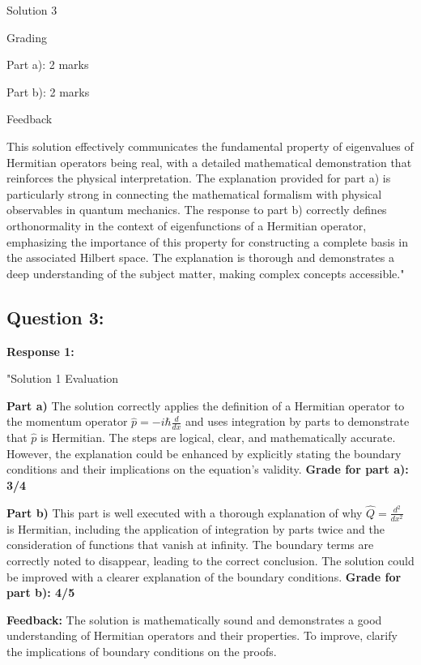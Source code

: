 \documentclass[a4paper,11pt]{article}
\begin{document}
Solution 3

Grading

Part a): 2 marks

Part b): 2 marks

Feedback

This solution effectively communicates the fundamental property of eigenvalues of Hermitian operators being real, with a detailed mathematical demonstration that reinforces the physical interpretation. The explanation provided for part a) is particularly strong in connecting the mathematical formalism with physical observables in quantum mechanics. The response to part b) correctly defines orthonormality in the context of eigenfunctions of a Hermitian operator, emphasizing the importance of this property for constructing a complete basis in the associated Hilbert space. The explanation is thorough and demonstrates a deep understanding of the subject matter, making complex concepts accessible."


\subsection*{Question 3:}

\textbf{Response 1:}

"Solution 1 Evaluation

\textbf{Part a)} The solution correctly applies the definition of a Hermitian operator to the momentum operator \(\hat{p} = -i\hbar\frac{d}{dx}\) and uses integration by parts to demonstrate that \(\hat{p}\) is Hermitian. The steps are logical, clear, and mathematically accurate. However, the explanation could be enhanced by explicitly stating the boundary conditions and their implications on the equation's validity. \textbf{Grade for part a): 3/4}

\textbf{Part b)} This part is well executed with a thorough explanation of why \(\hat{Q} = \frac{d^{2}}{dx^{2}}\) is Hermitian, including the application of integration by parts twice and the consideration of functions that vanish at infinity. The boundary terms are correctly noted to disappear, leading to the correct conclusion. The solution could be improved with a clearer explanation of the boundary conditions. \textbf{Grade for part b): 4/5}

\textbf{Feedback:} The solution is mathematically sound and demonstrates a good understanding of Hermitian operators and their properties. To improve, clarify the implications of boundary conditions on the proofs.
\end{document}
